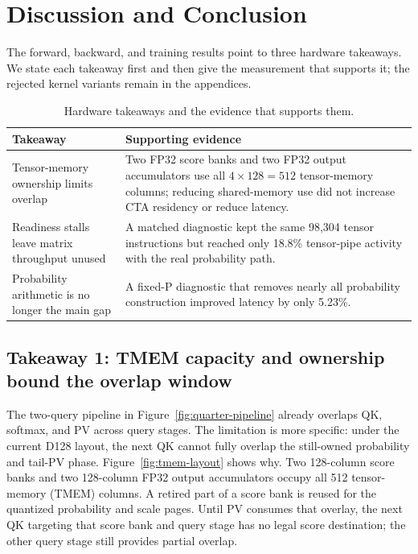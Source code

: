 \FloatBarrier
\section{Discussion and Conclusion}
\label{sec:current-headroom}

The forward, backward, and training results point to three hardware
takeaways.  We state each takeaway first and then give the measurement that
supports it; the rejected kernel variants remain in the appendices.

\begin{table}[htbp]
\centering
\caption{Hardware takeaways and the evidence that supports them.}
\label{tab:hardware-takeaways}
\small
\begin{tabularx}{\textwidth}{p{}X}
\toprule
Takeaway & Supporting evidence \\
\midrule
Tensor-memory ownership limits overlap & Two FP32 score banks and two FP32
output accumulators use all $4\times128=512$ tensor-memory columns; reducing
shared-memory use did not increase CTA residency or reduce latency. \\
Readiness stalls leave matrix throughput unused & A matched diagnostic kept
the same 98,304 tensor instructions but reached only 18.8\% tensor-pipe
activity with the real probability path. \\
Probability arithmetic is no longer the main gap & A fixed-P diagnostic that
removes nearly all probability construction improved latency by only 5.23\%. \\
\bottomrule
\end{tabularx}
\end{table}

\subsection{Takeaway 1: TMEM capacity and ownership bound the overlap window}

The two-query pipeline in Figure~\ref{fig:quarter-pipeline} already overlaps
QK, softmax, and PV across query stages.  The limitation is more specific:
under the current D128 layout, the next QK cannot fully overlap the still-owned
probability and tail-PV phase.  Figure~\ref{fig:tmem-layout} shows why.  Two
128-column score banks and two 128-column FP32 output accumulators occupy all
512 tensor-memory (TMEM) columns.  A retired part of a score bank is reused for
the quantized probability and scale pages.  Until PV consumes that overlay,
the next QK targeting that score bank and query stage has no legal score
destination; the other query stage still provides partial overlap.

